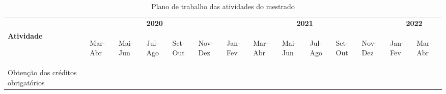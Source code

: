 \begin{table}[!ht]%
\centering
\fontsize{10pt}{10pt}\selectfont
\caption{Plano de trabalho das atividades do mestrado}
\label{tab:cronograma}
\begin{tabular}{|l|l|l|l|l|l|l|l|l|l|l|l|l|l|} 
\hline
                                         & \multicolumn{5}{c|}{\textbf{2020}}                                                                                                                                                                    & \multicolumn{6}{c|}{\textbf{2021}}                                                                                                                                                                                                            & \multicolumn{2}{c|}{\textbf{2022}}                                             \\ 
\cline{2-14}
\textbf{\textbf{Atividade}}              & \begin{sideways}Mar-Abr\end{sideways} & \begin{sideways}Mai-Jun\end{sideways} & \begin{sideways}Jul-Ago\end{sideways} & \begin{sideways}Set-Out\end{sideways} & \begin{sideways}Nov-Dez\end{sideways} & \begin{sideways}Jan-Fev\end{sideways} & \begin{sideways}Mar-Abr\end{sideways} & \begin{sideways}Mai-Jun\end{sideways} & \begin{sideways}Jul-Ago\end{sideways} & \begin{sideways}Set-Out\end{sideways} & \begin{sideways}Nov-Dez\end{sideways} & \begin{sideways}Jan-Fev\end{sideways} & \begin{sideways}Mar-Abr\end{sideways}  \\ 
\hline
Obtenção dos créditos obrigatórios       & {\cellcolor[rgb]{0.396,0.396,0.396}}  & {\cellcolor[rgb]{0.396,0.396,0.396}}  & {\cellcolor[rgb]{0.396,0.396,0.396}}  & {\cellcolor[rgb]{0.396,0.396,0.396}}  & {\cellcolor[rgb]{0.396,0.396,0.396}}  &                                       &                                       &                                       &                                       &                                       &                                       &                                       &                                        \\ 

\end{tabular}
\end{table}
